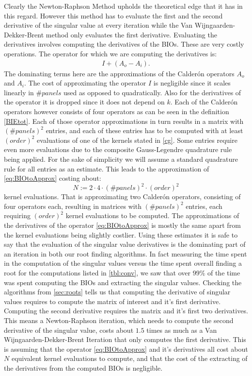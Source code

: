 \documentclass[a4paper, oneside]{thirdparty_stylesheets/discothesis}
\begin{document}
Clearly the Newton-Raphson Method upholds the theoretical edge that it has in this regard.
However this method has to evaluate the first and the second derivative of the singular value at every iteration while the Van Wijngaarden-Dekker-Brent method only evaluates the first derivative.
Evaluating the derivatives involves computing the derivatives of the BIOs.
These are very costly operations.
The operator for which we are computing the derivatives is:
\begin{align}
	I + (A_o-A_i) \label{eq:BIOtoApprox}.
\end{align}
The dominating terms here are the approximations of the Calderón operators $A_o$ and $A_i$.
The cost of approximating the operator $I$ is negligible since it scales linearly in $\#panels$ used as opposed to quadratically.
Also for the derivatives of the operator it is dropped since it does not depend on $k$.
Each of the Calderón operators however consists of four operators as can be seen in the definition \ref{BIEtot}.
Each of those operator approximations in turn results in a matrix with $(\#panels)^2$ entries, and each of these entries has to be computed with at least $(order)^2$ evaluations of one of the kernels stated in \ref{cg}.
Some entries require even more evaluations due to the composite Gauss-Legendre quadrature rule being applied.
For the sake of simplicity we will assume a standard quadrature rule for all entries as an estimate.
This leads to the approximation of \ref{eq:BIOtoApprox} costing about:
\begin{equation}
	N := 2\cdot4\cdot(\#panels)^2\cdot(order)^2
\end{equation}
kernel evaluations.
That is approximating two Calderón operators, consisting of four operators each, resulting in matrices with $(\#panels)^2$ entries, each requiring $(order)^2$ kernel evaluations to be computed. 
The approximations of the derivatives of the operator \ref{eq:BIOtoApprox} is mostly the same apart from the kernel evaluations being slightly costlier.
Using these estimates it is safe to say that the evaluation of the singular value derivatives is the dominating part of an iteration in both our root finding algorithms.
In fact measuring the time spent in the computation of the singular values versus the time spent overall finding a root for the computations listed in \ref{tbl:conv}, we saw that over $99\%$ of the time was spent computing the BIOs and extracting the singular values.
Checking the algorithms from \ref{sec:roots} tells us that computing the derivative of singular values requires to compute the matrix of interest and it's first derivative.
Computing the second derivative requires the matrix and it's first two derivatives.
This means a Newton-Raphson iteration, which needs to compute the second derivative of the singular value, costs about $1.5$ times as much as a Van Wijngaarden-Dekker-Brent Iteration that only computes the first derivative.
This is assuming that the operator \ref{eq:BIOtoApprox} and it's derivatives all cost about $N$ equivalent kernel evaluations to compute, and that the cost of the extracting of the derivatives from the computed BIOs is negligible.
\end{document}
